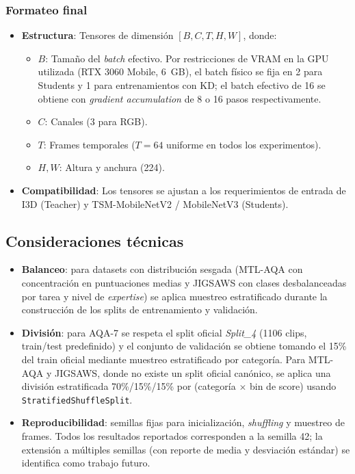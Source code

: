 \subsubsection{Formateo final}
\begin{itemize}
    \item \textbf{Estructura}: Tensores de dimensión $[B, C, T, H, W]$, donde:
        \begin{itemize}
            \item $B$: Tamaño del \textit{batch} efectivo. Por restricciones de VRAM en la GPU utilizada (RTX 3060 Mobile, 6~GB), el batch físico se fija en 2 para Students y 1 para entrenamientos con KD; el batch efectivo de 16 se obtiene con \textit{gradient accumulation} de 8 o 16 pasos respectivamente.
            \item $C$: Canales (3 para RGB).
            \item $T$: Frames temporales ($T = 64$ uniforme en todos los experimentos).
            \item $H, W$: Altura y anchura (224).
        \end{itemize}
    \item \textbf{Compatibilidad}: Los tensores se ajustan a los requerimientos de entrada de I3D (Teacher) y TSM-MobileNetV2 / MobileNetV3 (Students).
\end{itemize}

\subsection{Consideraciones técnicas}
\begin{itemize}
    \item \textbf{Balanceo}: para datasets con distribución sesgada (MTL-AQA con concentración en puntuaciones medias y JIGSAWS con clases desbalanceadas por tarea y nivel de \textit{expertise}) se aplica muestreo estratificado durante la construcción de los splits de entrenamiento y validación.
    \item \textbf{División}: para AQA-7 se respeta el split oficial \textit{Split\_4} (1106 clips, train/test predefinido) y el conjunto de validación se obtiene tomando el 15\% del train oficial mediante muestreo estratificado por categoría. Para MTL-AQA y JIGSAWS, donde no existe un split oficial canónico, se aplica una división estratificada 70\%/15\%/15\% por (categoría $\times$ bin de score) usando \texttt{StratifiedShuffleSplit}.
    \item \textbf{Reproducibilidad}: semillas fijas para inicialización, \textit{shuffling} y muestreo de frames. Todos los resultados reportados corresponden a la semilla 42; la extensión a múltiples semillas (con reporte de media y desviación estándar) se identifica como trabajo futuro.
\end{itemize}

